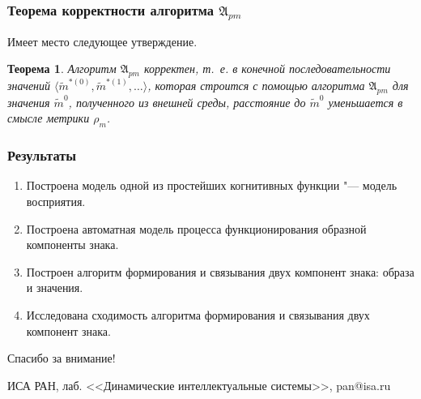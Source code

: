 \documentclass[default]{beamer}
\newtheorem{Theorem}{Теорема}
\begin{document}
\begin{frame}
	\end{frame}
	
	\begin{frame}
		\frametitle{Теорема корректности алгоритма $\mathfrak A_{pm}$}
		Имеет место следующее утверждение.
		\par\bigskip
		\begin{Theorem}
			Алгоритм $\mathfrak A_{pm}$ корректен, т.~е. в конечной последовательности значений $\langle\tilde m^{*(0)},\tilde m^{*(1)},\dots\rangle$, которая строится с помощью алгоритма $\mathfrak A_{pm}$ для  значения $\tilde m^0$, полученного из внешней среды, расстояние до $\tilde m^0$ уменьшается в смысле метрики $\rho_m$.
		\end{Theorem}
	\end{frame}
	
	\begin{frame}
		\frametitle{Результаты}
		\begin{enumerate}
			\item Построена модель одной из простейших когнитивных функции "--- модель восприятия.
			\item Построена автоматная модель процесса функционирования образной компоненты знака.
			\item Построен алгоритм формирования и связывания двух компонент знака: образа и значения.
			\item Исследована сходимость алгоритма формирования и связывания двух компонент знака.
		\end{enumerate}
	\end{frame}
	
	\begin{frame}
		\centering
		\Huge
		Спасибо за внимание!
		\normalsize
		\par\bigskip
		\par\bigskip
		ИСА РАН, лаб. <<Динамические интеллектуальные системы>>, pan@isa.ru
	\end{frame}
									
	
\end{document}
